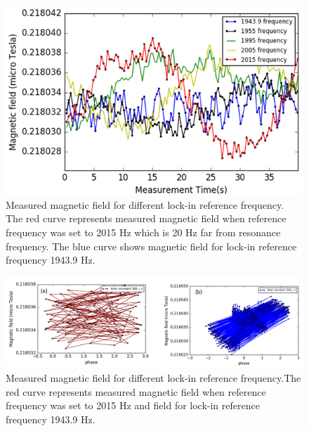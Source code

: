 \begin{figure}[h]
\centering\includegraphics[width=0.8\linewidth]{figures/reference_frequency}
\caption{Measured magnetic field for different lock-in reference frequency. The red curve represents measured magnetic field when reference frequency was set to 2015 Hz which is 20 Hz far from resonance frequency. The blue curve shows magnetic field for lock-in reference frequency 1943.9 Hz.}
\end{figure}
\begin{figure}[h]
\centering\includegraphics[width=0.8\linewidth]{figures/phase}
\caption{Measured magnetic field for different lock-in reference frequency.The red curve represents measured magnetic field when reference frequency was set to 2015 Hz and field for lock-in reference frequency 1943.9 Hz.}
\end{figure}
\newpage

